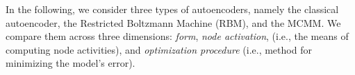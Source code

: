In the following, we consider three types
of autoencoders, namely the classical autoencoder, the Restricted Boltzmann Machine (RBM),
and the MCMM. We compare them across three dimensions: \emph{form}, \emph{node activation}, 
(i.e., the means of computing node activities), and \emph{optimization procedure}
(i.e., method for minimizing the model's error).



